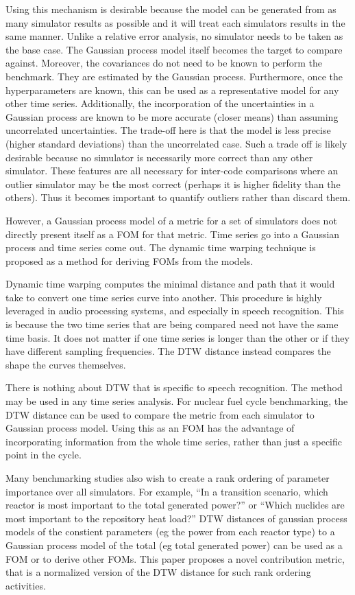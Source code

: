 Using this mechanism is desirable because the model can be generated
from as many simulator results as possible and it will treat each simulators
results in the same manner. Unlike a relative error analysis, no simulator
needs to be taken as the base case. The Gaussian process model itself becomes
the target to compare against. 
Moreover, the covariances do not need to be known to perform the benchmark.
They are estimated by the Gaussian process. Furthermore, once the 
hyperparameters are known, this can be used as a representative model for 
any other time series. Additionally, the incorporation of the uncertainties
in a Gaussian process are known to be more accurate (closer means) than 
assuming uncorrelated uncertainties.  The trade-off here is that the 
model is less precise (higher standard deviations) than the uncorrelated 
case. Such a trade off is likely desirable because no simulator is 
necessarily more correct than any other simulator. These features are all 
necessary for inter-code comparisons where an outlier simulator may be the 
most correct (perhaps it is higher fidelity than the others). Thus it
becomes important to quantify outliers rather than discard them.

However, a Gaussian process model of a metric for a set of simulators 
does not directly present itself as a FOM for that metric. Time series go 
into a Gaussian process and time series come out. The dynamic time warping 
technique is proposed as a method for deriving FOMs from the models.  

Dynamic time warping computes the minimal distance and path that it would 
take to convert one time series curve into another. This procedure is highly 
leveraged in audio processing systems, and especially in speech recognition.
This is because the two time series that are being compared need not have
the same time basis.  It does not matter if one time series is longer than 
the other or if they have different sampling frequencies. The DTW distance
instead compares the shape the curves themselves. 

There is nothing about DTW that is specific to speech recognition. The method
may be used in any time series analysis. For nuclear fuel cycle benchmarking,
the DTW distance can be used to compare the metric from each simulator to 
Gaussian process model. Using this as an FOM has the advantage of 
incorporating information from the whole time series, rather than just a 
specific point in the cycle.

Many benchmarking studies also wish to create a rank ordering of parameter
importance over all simulators.  For example, ``In a transition scenario,
which reactor is most important to the total generated power?'' or ``Which
nuclides are most important to the repository heat load?'' DTW distances 
of gaussian process models of the constient parameters (eg the power from
each reactor type) to a Gaussian process model of the total (eg total 
generated power) can be used as a FOM or to derive other FOMs. This paper
proposes a novel contribution metric, that is a normalized version of the DTW 
distance for such rank ordering activities.

